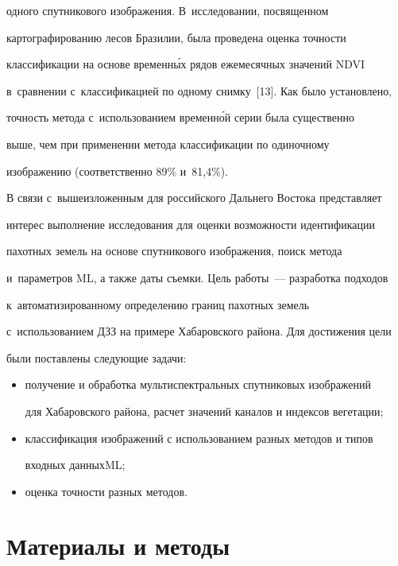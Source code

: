 одного спутникового изображения. В~исследовании, посвященном 

картографированию лесов Бразилии, была проведена оценка точности 

классификации на основе временн\'{ы}х рядов ежемесячных значений NDVI 

в~сравнении с~классификацией по одному снимку~[13]. Как было установлено, 

точность метода с~использованием временн\'{о}й серии была существенно 

выше, чем при применении метода классификации по одиночному 

изображению (соответственно 89\% и~81,4\%).

  

  В связи с~вышеизложенным для российского Дальнего Востока представляет 

интерес выполнение исследования для оценки возможности идентификации 

пахотных земель на основе спутникового изображения, поиск метода 

и~параметров ML, а также даты съемки. Цель работы~--- разработка подходов 

к~автоматизированному определению границ пахотных земель 

с~использованием ДЗЗ на примере Хабаровского района. Для достижения цели 

были поставлены следующие задачи:

  \begin{itemize}

  \item получение и обработка мультиспектральных спутниковых изображений 

для Хабаровского района, расчет значений каналов и индексов вегетации;

  \item классификация изображений с использованием разных методов и типов 

входных данныхML;

  \item оценка точности разных методов.

  \end{itemize}

  

\section{Материалы и методы}



